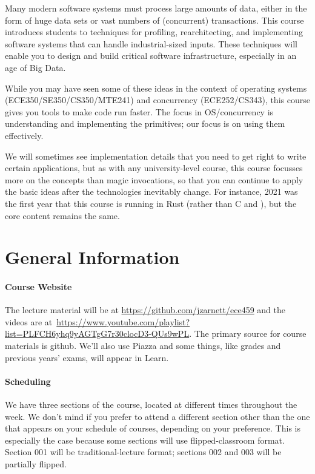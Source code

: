 Many modern software systems must process large amounts of data, either in the
form of huge data sets or vast numbers of (concurrent) transactions.  This
course introduces students to techniques for profiling, rearchitecting, and
implementing software systems that can handle industrial-sized
inputs. These techniques will enable you to design and build
critical software infrastructure, especially in an age of Big Data.

While you may have seen some of these ideas in the context of
operating systems (ECE350/SE350/CS350/MTE241) and concurrency (ECE252/CS343), this course gives you tools to make code run
faster. The focus in OS/concurrency is understanding and implementing the
primitives; our focus is on using them effectively. 

We will sometimes see implementation details that you need to get right to write
certain applications, but as with any university-level course, this course
focusses more on the concepts than magic invocations, so that you can continue
to apply the basic ideas after the technologies inevitably change. For instance,
2021 was the first year that this course is running in Rust (rather than C and \CPP),
but the core content remains the same.


\section*{General Information}

\paragraph{Course Website} The lecture material will be at \url{https://github.com/jzarnett/ece459} and the videos are at~\url{https://www.youtube.com/playlist?list=PLFCH6yhq9yAGTgG7r30clocD3-QUs9wPL}.  The primary source for course materials is github. We'll also use Piazza and some things, like grades and previous years' exams, will appear in Learn.

\paragraph{Scheduling}
We have three sections of the course, located at different times throughout the week. We don't mind if you prefer to attend a different section other than the one that appears on your schedule of courses, depending on your preference. This is especially the case because some sections will use flipped-classroom format. Section 001 will be traditional-lecture format; sections 002 and 003 will be partially flipped.  

